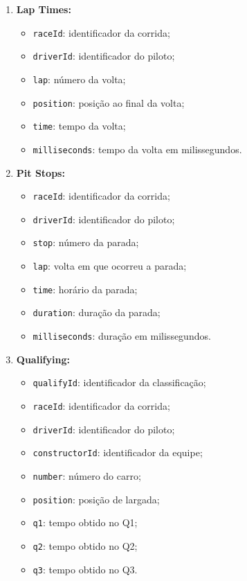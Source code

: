 \documentclass[12pt]{article}
\begin{document}
\begin{enumerate}
    \item \textbf{Lap Times:}
    \begin{itemize}
        \item \texttt{raceId}: identificador da corrida;
        \item \texttt{driverId}: identificador do piloto;
        \item \texttt{lap}: número da volta;
        \item \texttt{position}: posição ao final da volta;
        \item \texttt{time}: tempo da volta;
        \item \texttt{milliseconds}: tempo da volta em milissegundos.
    \end{itemize}

    \item \textbf{Pit Stops:}
    \begin{itemize}
        \item \texttt{raceId}: identificador da corrida;
        \item \texttt{driverId}: identificador do piloto;
        \item \texttt{stop}: número da parada;
        \item \texttt{lap}: volta em que ocorreu a parada;
        \item \texttt{time}: horário da parada;
        \item \texttt{duration}: duração da parada;
        \item \texttt{milliseconds}: duração em milissegundos.
    \end{itemize}

    \item \textbf{Qualifying:}
    \begin{itemize}
        \item \texttt{qualifyId}: identificador da classificação;
        \item \texttt{raceId}: identificador da corrida;
        \item \texttt{driverId}: identificador do piloto;
        \item \texttt{constructorId}: identificador da equipe;
        \item \texttt{number}: número do carro;
        \item \texttt{position}: posição de largada;
        \item \texttt{q1}: tempo obtido no Q1;
        \item \texttt{q2}: tempo obtido no Q2;
        \item \texttt{q3}: tempo obtido no Q3.
    \end{itemize}


\end{enumerate}
\end{document}
